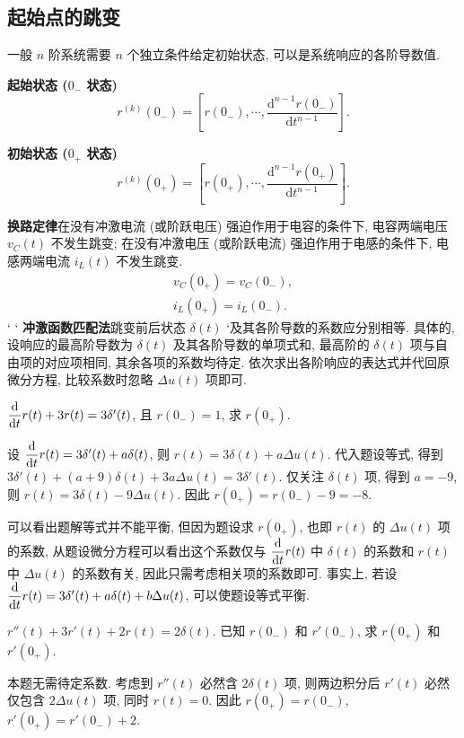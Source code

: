 \subsection{起始点的跳变} \label{起始点的跳变}

一般 $n$ 阶系统需要 $n$ 个独立条件给定初始状态, 可以是系统响应的各阶导数值.

\textbf{起始状态 ($0_{-}$ 状态)}
\begin{equation}
    r^{(k)}(0_{-})=\left[r(0_{-}),\cdots,\frac{\mathrm{d}^{n-1}r(0_{-})}{\mathrm{d}t^{n-1}}\right].
\end{equation}

\textbf{初始状态 ($0_{+}$ 状态)}
\begin{equation}
    r^{(k)}(0_{+})=\left[r(0_{+}),\cdots,\frac{\mathrm{d}^{n-1}r(0_{+})}{\mathrm{d}t^{n-1}}\right].
\end{equation}

\textbf{换路定律}\quad 在没有冲激电流 (或阶跃电压) 强迫作用于电容的条件下, 电容两端电压 $v_C(t)$ 不发生跳变; 在没有冲激电压 (或阶跃电流) 强迫作用于电感的条件下, 电感两端电流 $i_L(t)$ 不发生跳变.
\begin{gather}
    v_C(0_{+})=v_C(0_{-}), \label{eq:2.2 transformation theorem v_C} \\
    i_L(0_{+})=i_L(0_{-}). \label{eq:2.2 transformation theorem i_L}
\end{gather}`
`
\textbf{冲激函数匹配法}\quad 跳变前后状态 $\delta(t)$ `及其各阶导数的系数应分别相等. 具体的, 设响应的最高阶导数为 $\delta(t)$ 及其各阶导数的单项式和, 最高阶的 $\delta(t)$ 项与自由项的对应项相同, 其余各项的系数均待定. 依次求出各阶响应的表达式并代回原微分方程, 比较系数时忽略 $\Delta u(t)$ 项即可.

\begin{exampleprob}
    $\ddd{1}{t}r(t)+3r(t)=3\delta'(t)$, 且 $r(0_-)=1$, 求 $r(0_+)$.

    \begin{solution}
        设 $\ddd{1}{t}r(t)=3\delta'(t)+a\delta(t)$, 则 $r(t)=3\delta(t)+a\Delta u(t)$. 代入题设等式, 得到 $3\delta'(t)+(a+9)\delta(t)+3a\Delta u(t)=3\delta'(t)$. {\color{red} 仅关注 $\delta(t)$ 项}, 得到 $a=-9$, 则 $r(t)=3\delta(t)-9\Delta u(t)$. 因此 $r(0_+)=r(0_-)-9=-8$.

        可以看出题解等式并不能平衡, 但因为题设求 $r(0_+)$, 也即 $r(t)$ 的 $\Delta u(t)$ 项的系数, 从题设微分方程可以看出这个系数仅与 $\ddd{1}{t}r(t)$ 中 $\delta(t)$ 的系数和 $r(t)$ 中 $\Delta u(t)$ 的系数有关, 因此只需考虑相关项的系数即可. 事实上, 若设 $\ddd{1}{t}r(t)=3\delta'(t)+a\delta(t)+b\Delta u(t)$, 可以使题设等式平衡.
    \end{solution}
\end{exampleprob}

\begin{exampleprob}
    $r''(t)+3r'(t)+2r(t)=2\delta(t)$. 已知 $r(0_-)$ 和 $r'(0_-)$, 求 $r(0_+)$ 和 $r'(0_+)$.

    \begin{solution}
        本题无需待定系数. 考虑到 $r''(t)$ 必然含 $2\delta(t)$ 项, 则两边积分后 $r'(t)$ 必然{\color{red} 仅}包含 $2\Delta u(t)$ 项, 同时 $r(t)=0$. 因此 $r(0_+)=r(0_-)$, $r'(0_+)=r'(0_-)+2$.
    \end{solution}
\end{exampleprob}
